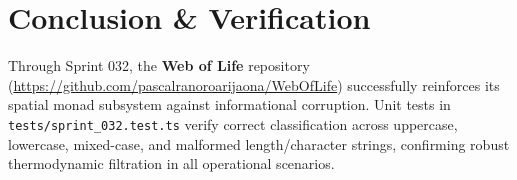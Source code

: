 \documentclass[11pt, a4paper]{article}
\begin{document}
\section{Conclusion \& Verification}
Through Sprint 032, the \textbf{Web of Life} repository (\url{https://github.com/pascalranoroarijaona/WebOfLife}) successfully reinforces its spatial monad subsystem against informational corruption. Unit tests in \texttt{tests/sprint\_032.test.ts} verify correct classification across uppercase, lowercase, mixed-case, and malformed length/character strings, confirming robust thermodynamic filtration in all operational scenarios.
\end{document}
